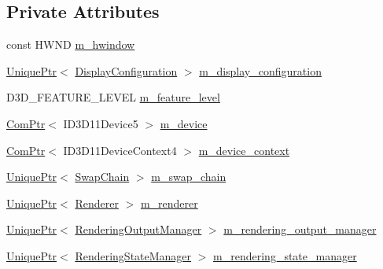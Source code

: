 \subsection*{Private Attributes}
\begin{DoxyCompactItemize}
\item 
const H\+W\+ND \hyperlink{classmage_1_1_rendering_manager_a75a2ed9a4bac39c2b03960ceadd6c7dd}{m\+\_\+hwindow}
\item 
\hyperlink{namespacemage_a3316d7143a973e37adf1110f2e80ca31}{Unique\+Ptr}$<$ \hyperlink{structmage_1_1_display_configuration}{Display\+Configuration} $>$ \hyperlink{classmage_1_1_rendering_manager_a23a8d0b6bccba3379eafcece28b28090}{m\+\_\+display\+\_\+configuration}
\item 
D3\+D\+\_\+\+F\+E\+A\+T\+U\+R\+E\+\_\+\+L\+E\+V\+EL \hyperlink{classmage_1_1_rendering_manager_a46dc60cd94efc7ad370fd64bd9d6813d}{m\+\_\+feature\+\_\+level}
\item 
\hyperlink{namespacemage_ae74f374780900893caa5555d1031fd79}{Com\+Ptr}$<$ I\+D3\+D11\+Device5 $>$ \hyperlink{classmage_1_1_rendering_manager_adeb8bcb91a132686d683b33af46979f8}{m\+\_\+device}
\item 
\hyperlink{namespacemage_ae74f374780900893caa5555d1031fd79}{Com\+Ptr}$<$ I\+D3\+D11\+Device\+Context4 $>$ \hyperlink{classmage_1_1_rendering_manager_a8838eae5c90bbdf5282655ac4f7af7fd}{m\+\_\+device\+\_\+context}
\item 
\hyperlink{namespacemage_a3316d7143a973e37adf1110f2e80ca31}{Unique\+Ptr}$<$ \hyperlink{classmage_1_1_swap_chain}{Swap\+Chain} $>$ \hyperlink{classmage_1_1_rendering_manager_acec25677bd92ddca6cb18efc1ed5fb38}{m\+\_\+swap\+\_\+chain}
\item 
\hyperlink{namespacemage_a3316d7143a973e37adf1110f2e80ca31}{Unique\+Ptr}$<$ \hyperlink{classmage_1_1_renderer}{Renderer} $>$ \hyperlink{classmage_1_1_rendering_manager_ade28531cb0299efcf297b09e9f35bd79}{m\+\_\+renderer}
\item 
\hyperlink{namespacemage_a3316d7143a973e37adf1110f2e80ca31}{Unique\+Ptr}$<$ \hyperlink{classmage_1_1_rendering_output_manager}{Rendering\+Output\+Manager} $>$ \hyperlink{classmage_1_1_rendering_manager_a305697e04c779ea637c1e11ae9065a69}{m\+\_\+rendering\+\_\+output\+\_\+manager}
\item 
\hyperlink{namespacemage_a3316d7143a973e37adf1110f2e80ca31}{Unique\+Ptr}$<$ \hyperlink{classmage_1_1_rendering_state_manager}{Rendering\+State\+Manager} $>$ \hyperlink{classmage_1_1_rendering_manager_aa31eab8068bf43e3b90f72644495c16a}{m\+\_\+rendering\+\_\+state\+\_\+manager}
\end{DoxyCompactItemize}


